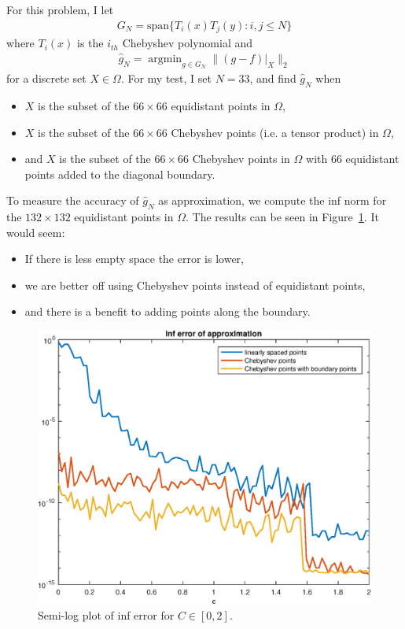 \documentclass{article}
\DeclareMathOperator*{\argmin}{argmin}
\begin{document}
For this problem, I let
\begin{align}
G_N = \text{span}\{T_i(x) T_j(y):i,j \leq N\}
\end{align}
where $T_i(x)$ is the $i_{th}$ Chebyshev polynomial and
\begin{align}
\hat{g}_N = \argmin_{g \in G_N} \| \left . (g-f) \right |_{X} \|_2
\end{align}
for a discrete set $X \in \Omega$. For my test, I set $N=33$, and find $\hat{g}_N$ when
\begin{itemize}
\item $X$ is the subset of the $66 \times 66$ equidistant points in $\Omega$,
\item $X$ is the subset of the $66 \times 66$ Chebyshev points (i.e. a tensor product) in $\Omega$,
\item and $X$ is the subset of the $66 \times 66$ Chebyshev points in $\Omega$ with 66 equidistant points added to the diagonal boundary.
\end{itemize}
To measure the accuracy of $\hat{g}_N $ as approximation, we compute the inf norm for the $132 \times 132$ equidistant points in $\Omega$. The results can be seen in Figure~\ref{line_err_plots}. It would seem:
\begin{itemize}
\item If there is less empty space the error is lower,
\item we are better off using Chebyshev points instead of equidistant points,
\item and there is a benefit to adding points along the boundary.
\end{itemize}


\begin{figure}[!h]
\centering
\includegraphics[scale = 0.5]{line_err_plot.eps}
\caption{Semi-log plot of inf error for $C \in [0,2]$.}
\label{line_err_plots}
\end{figure}
\end{document}
